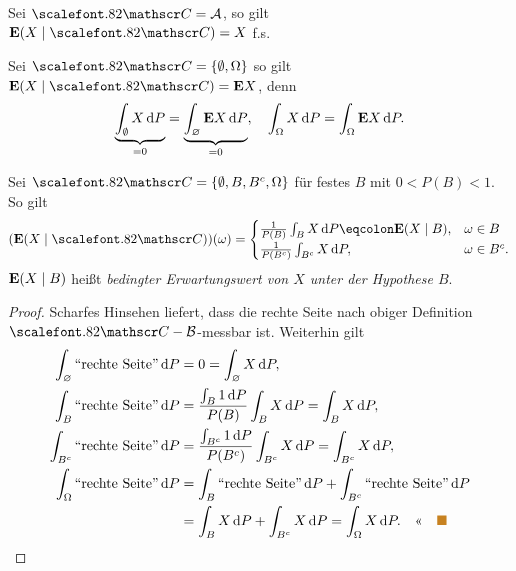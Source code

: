 \begin{bsp}
\label{bsp:10.1}
\begin{bspenum}
\item Sei ${\CC} = {\AA}$, so gilt $\E(X\mid {\CC}) = X $ f.s.
\item Sei $\CC =  \setd{\emptyset, \Omega}$ so gilt $\E(X\mid {\CC}) = \E
X$, denn
\begin{align*}
\underbrace{\int_\emptyset X\,\mathrm{d} P}_{=0} = \underbrace{\int_\varnothing \textbf{E}
X\,\mathrm{d} P}_{=0},\quad
\int_\Omega X\,\mathrm{d} P = \int_\Omega \textbf{E} X \,\mathrm{d} P.
\end{align*}
\item Sei ${\CC} = \setd{\emptyset, B, B^ {c},\Omega}$ für festes $B$
mit $0<P(B)<1$. So gilt
\begin{align*}
(\E(X\mid {\CC}))(\omega)=
\begin{cases}
\frac{1}{P(B)} \int_{B} X\dP \defr \E(X\mid B),
  & \omega \in B\\
\frac{1}{P(B^ {c})} \int_{B^{c}}X\dP, & \omega \in B^ {c}.
\end{cases}
\end{align*}
$\textbf{E}(X\mid B)$ heißt \emph{bedingter Erwartungswert von $X$ unter der
Hypothese $B$}.
\begin{proof}
Scharfes Hinsehen liefert, dass die rechte Seite nach obiger Definition
$\CC-\BB$-messbar ist. Weiterhin gilt
\begin{align*}
\int_\varnothing ``\text{rechte Seite}"\dP &= 0 = \int_\varnothing X\dP,\\
\int_B ``\text{rechte Seite}" \dP& = \frac{\int_B 1\dP}{P(B)}\int_B X\dP =
\int_B X\dP,\\
\int_{B^c} ``\text{rechte Seite}" \dP& = \frac{\int_{B^c}
1\dP}{P(B^c)}\int_{B^c} X\dP = \int_{B^c} X\dP,\\
\int_\Omega ``\text{rechte Seite}" \dP
&= \int_{B} ``\text{rechte Seite}" \dP
+ \int_{B^c} ``\text{rechte Seite}" \dP\\
&= \int_{B} X \dP
+ \int_{B^c} X \dP
= \int_\Omega X\dP.\qedhere\bsphere
\end{align*}
\end{proof}
\end{bspenum}
\end{bsp}

